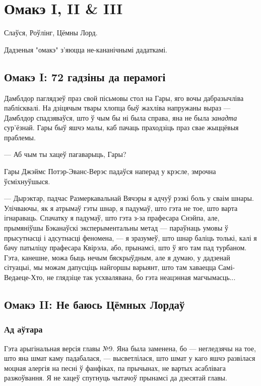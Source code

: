 \chapter{Омакэ I, II \& III}

\begin{chapterOpeningAuthorNote}
Слаўся, Роўлінг, Цёмны Лорд.

Дадзеныя "омакэ" з'яюцца не-кананічнымі дадаткамі.
\end{chapterOpeningAuthorNote}

\section{Омакэ I: 72 гадзіны да перамогі}

Дамблдор паглядзеў праз свой пісьмовы стол на Гары, яго вочы дабразычліва 
паблісквалі. На дзіцячым твары хлопца быў жахліва напружаны выраз --- Дамблдор 
спадзяваўся, што ў чым бы ні была справа, яна не была \emph{занадта} сур'ёзнай.
Гары быў яшчэ малы, каб пачаць праходзіць праз свае жыццёвыя праблемы.

--- Аб чым ты хацеў пагаварыць, Гары?

Гары Джэймс Потэр-Эванс-Верэс падаўся наперад у крэсле, змрочна ўсміхнуўшыся.

--- Дырэктар, падчас Размеркавальнай Вячэры я адчуў рэзкі боль у сваім шнары. 
Улічваючы, як я атрымаў гэты шнар, я падумаў, што гэта не тое, што варта 
ігнараваць. Спачатку я падумаў, што гэта з-за прафесара Снэйпа, але, прымяніўшы 
Бэканаўскі эксперыментальны метад --- параўнаць умовы ў прысутнасці і адсутнасці
феномена, --- я зразумеў, што шнар баліць толькі, калі я бачу патыліцу прафесара 
Квірэла, або, прынамсі, што ў яго там пад турбаном. Гэта, канешне, можа быць 
нечым бяскрыўдным, але я думаю, у дадзенай сітуацыі, мы можам дапусціць найгоршы
варыянт, што там хаваецца Самі-Ведаеце-Хто, не глядзіце так усхвалявана, бо 
гэта неацэнная магчымасць...




\section{Омакэ II: Не баюсь Цёмных Лордаў}

\subsection{Ад аўтара}


Гэта арыгінальная версія главы №9. Яна была заменена, бо --- негледзячы на тое,
што яна шмат каму  падабалася, --- высветлілася, што шмат у каго яшчэ развілася
моцная алергія на песні ў фанфіках, па прычынах, не вартых асаблівага разжоўвання.
Я не хацеў спугнуць чытачоў прынамсі да дзесятай главы.


